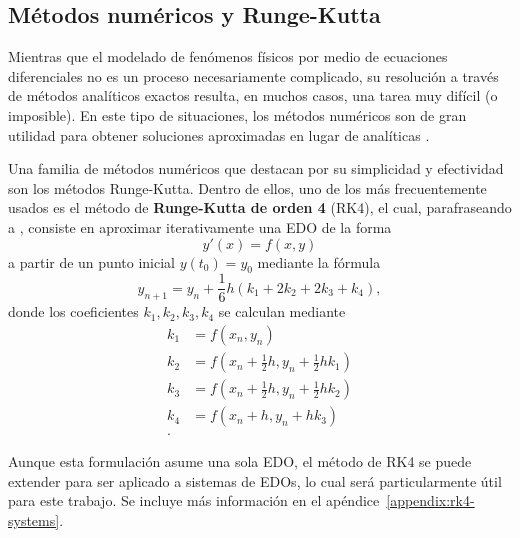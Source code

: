 \subsection{Métodos numéricos y Runge-Kutta}

Mientras que el modelado de fenómenos físicos por medio de ecuaciones diferenciales no es un proceso necesariamente complicado, su resolución a través de métodos analíticos exactos resulta, en muchos casos, una tarea muy difícil (o imposible). En este tipo de situaciones, los métodos numéricos son de gran utilidad para obtener soluciones aproximadas en lugar de analíticas \citep{reddy}.

Una familia de métodos numéricos que destacan por su simplicidad y efectividad son los métodos Runge-Kutta. Dentro de ellos, uno de los más frecuentemente usados es el método de \textbf{Runge-Kutta de orden 4} (RK4), el cual, parafraseando a \citet{suli}, consiste en aproximar iterativamente una EDO de la forma
\[
    y'(x) = f(x, y)
\]
a partir de un punto inicial \(y(t_0) = y_0\) mediante la fórmula
\[
    y_{n+1} = y_n + \frac{1}{6}h(k_1 + 2k_2 + 2k_3 + k_4)
,\]
donde los coeficientes \(k_1, k_2, k_3, k_4\) se calculan mediante
\begin{align*}
    k_1 &= f(x_n, y_n) \\
    k_2 &= f(x_n + \frac{1}{2}h, y_n + \frac{1}{2}hk_1) \\
    k_3 &= f(x_n + \frac{1}{2}h, y_n + \frac{1}{2}hk_2) \\
    k_4 &= f(x_n + h, y_n + hk_3) \\
.\end{align*}

Aunque esta formulación asume una sola EDO, el método de RK4 se puede extender para ser aplicado a sistemas de EDOs, lo cual será particularmente útil para este trabajo. Se incluye más información en el apéndice~\ref{appendix:rk4-systems}.
